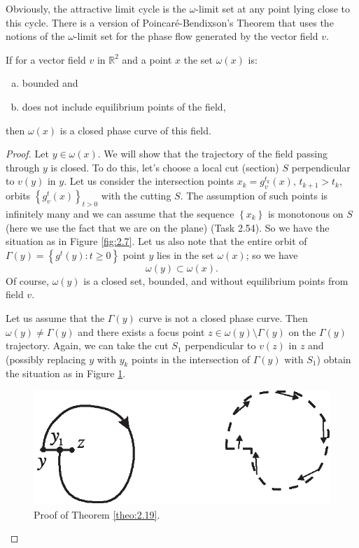 Obviously, the attractive limit cycle is the $ \omega$-limit set at any point lying close to this cycle. There is a version of Poincaré-Bendixson's Theorem that uses the notions of the $\omega $-limit set for the phase flow generated by the vector field $ v $.

\begin{theorem}\label{theo:2.19}
	If for a vector field $ v $ in $ \mathbb {R} ^ {2} $ and a point $ x $ the set $ \omega (x) $ is:
	\begin{enumerate}[(a)]
		\item bounded and
		\item does not include equilibrium points of the field,
	\end{enumerate}
	then $ \omega (x) $ is a closed phase curve of this field.
	\begin{proof}
		Let $ y \in \omega (x) $. We will show that the trajectory of the field passing through $ y $ is closed. To do this, let's choose a local cut (section) $ S $ perpendicular to $ v (y) $ in $ y $. Let us consider the intersection points $ x_ {k} = g_ {v} ^ {t_ {k}} (x) $, $ t_ {k + 1}> t_ {k} $, orbits $ \left \{g_ {v} ^ t (x) \right \} _ {t> 0} $ with the cutting $ S$. The assumption of such points is infinitely many and we can assume that the sequence $ \left \{x_ {k} \right \} $ is monotonous on $ S $ (here we use the fact that we are on the plane) (Task 2.54). So we have the situation as in Figure \ref{fig:2.7}. Let us also note that the entire orbit of $ \Gamma (y) = \left \{g ^ {t} (y): t \geq 0 \right \} $ point $ y $ lies in the set $ \omega (x) $; so we have
		$$
		\omega (y)\subset \omega (x).
		$$
		Of course, $ \omega (y) $ is a closed set, bounded, and without equilibrium points from field $ v $.
		
		Let us assume that the $ \Gamma (y) $ curve is not a closed phase curve. Then $ \omega (y) \not = \Gamma (y) $ and there exists a focus point $z\in \omega (y)\setminus \Gamma (y)$ on the $ \Gamma (y) $ trajectory. Again, we can take the cut $ S_ {1} $ perpendicular to $ v (z) $ in $ z $ and (possibly replacing $y$ with $y_{k}$ points in the intersection of $\Gamma (y)$ with $S_{1}$) obtain the situation as in Figure \ref{fig:2.8}.
		
		\begin{figure}[!ht]
			\centering
			\includegraphics [scale=1.05]{jtr28}
			\caption{Proof of Theorem \ref{theo:2.19}.}
			\label{fig:2.8}
		\end{figure}
	

\end{proof}
\end{theorem}
